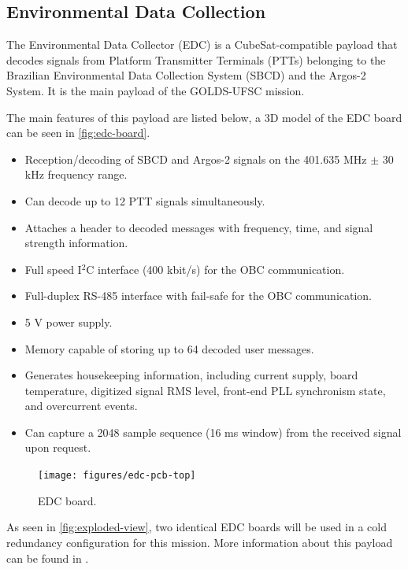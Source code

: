 \subsection{Environmental Data Collection}

The Environmental Data Collector (EDC) is a CubeSat-compatible payload that decodes signals from Platform Transmitter Terminals (PTTs) belonging to the Brazilian Environmental Data Collection System (SBCD) and the Argos-2 System. It is the main payload of the GOLDS-UFSC mission.

The main features of this payload are listed below, a 3D model of the EDC board can be seen in \autoref{fig:edc-board}.

\begin{itemize}
    \item Reception/decoding of SBCD and Argos-2 signals on the 401.635 MHz $\pm$ 30 kHz frequency range.
    \item Can decode up to 12 PTT signals simultaneously.
    \item Attaches a header to decoded messages with frequency, time, and signal strength information.
    \item Full speed I$^{2}$C interface (400 kbit/s) for the OBC communication.
    \item Full-duplex RS-485 interface with fail-safe for the OBC communication.
    \item 5 V power supply.
    \item Memory capable of storing up to 64 decoded user messages.
    \item Generates housekeeping information, including current supply, board temperature, digitized signal RMS level, front-end PLL synchronism state, and overcurrent events.
    \item Can capture a 2048 sample sequence (16 ms window) from the received signal upon request.
\end{itemize}

\begin{figure}[!ht]
    \begin{center}
        \texttt{[image: figures/edc-pcb-top]}
        \caption{EDC board.}
        \label{fig:edc-board}
    \end{center}
\end{figure}

As seen in \autoref{fig:exploded-view}, two identical EDC boards will be used in a cold redundancy configuration for this mission. More information about this payload can be found in \cite{edc}.

